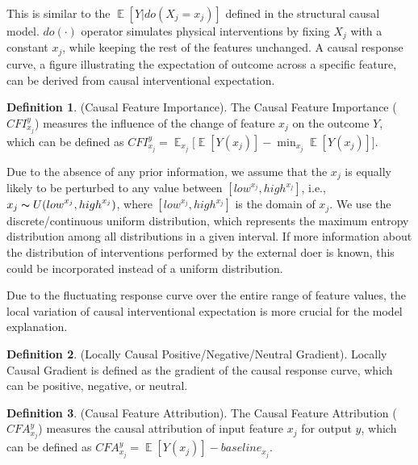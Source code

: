 \documentclass[letterpaper]{article} %
\DeclareMathOperator{\E}{\mathbb{E}}
\theoremstyle{definition}
\newtheorem{definition}{Definition}
\theoremstyle{remark}
\begin{document}
This is similar to the $\E[Y|do(X_j=x_j)]$ defined in the structural causal model. $do(\cdot)$ operator simulates physical interventions by fixing $X_j$ with a constant $x_j$, while keeping the rest of the features unchanged. A causal response curve, a figure illustrating the expectation of outcome across a specific feature, can be derived from causal interventional expectation.



\theoremstyle{definition}
\begin{definition}({Causal Feature Importance}).
The Causal Feature Importance ($CFI^y_{x_j}$) measures the influence of the change of feature $x_j$ on the outcome $Y$, which can be defined as $CFI^y_{x_j} = \E_{x_j} \Bigr[ \E [Y(x_j)] - \min_{x_j} \E[Y(x_j)] \Bigr] $.
\label{def: causal importance}
\end{definition}

Due to the absence of any prior information, we assume that the $x_j$ is equally likely to be perturbed to any value between $[{low}^{x_j}, {high}^{x_j}]$, i.e., $x_j \thicksim U({low}^{x_j}, {high}^{x_j})$, where $[{low}^{x_j}, {high}^{x_j}]$ is the domain of $x_j $. We use the discrete/continuous uniform distribution, which represents the maximum entropy distribution among all distributions in a given interval. If more information about the distribution of interventions performed by the external doer is known, this could be incorporated instead of a uniform distribution.

Due to the fluctuating response curve over the entire range of feature values, the local variation of causal interventional expectation is more crucial for the model explanation.

\theoremstyle{definition}
\begin{definition}({Locally Causal Positive/Negative/Neutral Gradient}). Locally Causal Gradient is defined as the gradient of the causal response curve, which can be positive, negative, or neutral.
\label{def: causal attribution}
\end{definition}

\theoremstyle{definition}
\begin{definition}({Causal Feature Attribution}).
The Causal Feature Attribution ($CFA^y_{x_j}$) measures the causal attribution of input feature $x_j$ for output $y$, which can be defined as $ CFA^y_{x_j} =  \E [Y(x_j)] - {baseline}_{x_j}  $.
\label{def: causal attribution}
\end{definition}
\end{document}
